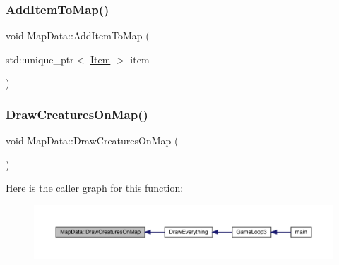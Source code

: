 \mbox{\label{class_map_data_a27d20220e1bd6db934312f30a15dbcb0}} 
\subsubsection{\texorpdfstring{Add\+Item\+To\+Map()}{AddItemToMap()}\hspace{0.1cm}{\footnotesize\ttfamily [2/2]}}
{\footnotesize\ttfamily void Map\+Data\+::\+Add\+Item\+To\+Map (\begin{DoxyParamCaption}\item[{std\+::unique\+\_\+ptr$<$ \mbox{\hyperlink{class_item}{Item}} $>$}]{item }\end{DoxyParamCaption})}

\mbox{\label{class_map_data_ad7ff044e19425487082134fe86221d07}} 
\subsubsection{\texorpdfstring{Draw\+Creatures\+On\+Map()}{DrawCreaturesOnMap()}}
{\footnotesize\ttfamily void Map\+Data\+::\+Draw\+Creatures\+On\+Map (\begin{DoxyParamCaption}{ }\end{DoxyParamCaption})}

Here is the caller graph for this function\+:
\nopagebreak
\begin{figure}[H]
\begin{center}
\leavevmode
\includegraphics[width=350pt]{class_map_data_ad7ff044e19425487082134fe86221d07_icgraph}
\end{center}
\end{figure}
\mbox{\label{class_map_data_abfdefc2bef87a02d3d83176ad6ba7832}} 
